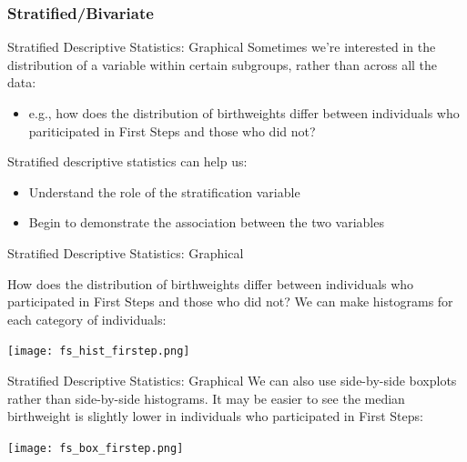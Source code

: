 \documentclass[10pt,t]{beamer}
\begin{document}
\subsubsection{Stratified/Bivariate}

\begin{frame}{Stratified Descriptive Statistics: Graphical}
Sometimes we're interested in the distribution of a variable within certain subgroups, rather than across all the data:

\vspace{0.3cm}

\begin{itemize}
	\item e.g., how does the distribution of birthweights differ between individuals who pariticipated in First Steps and those who did not?
\end{itemize}

\vspace{0.3cm}

Stratified descriptive statistics can help us:

\vspace{0.3cm}

\begin{itemize}
	\item Understand the role of the stratification variable
	\medskip
	\item Begin to demonstrate the association between the two variables
\end{itemize}

\end{frame}

\begin{frame}{Stratified Descriptive Statistics: Graphical}

How does the distribution of birthweights differ between individuals who participated in First Steps and those who did not? We can make histograms for each category of individuals:

\vspace{0.3cm}

\centering \texttt{[image: fs\_hist\_firstep.png]}

\end{frame}

\begin{frame}{Stratified Descriptive Statistics: Graphical}
We can also use side-by-side boxplots rather than side-by-side histograms. It may be easier to see the median birthweight is slightly lower in individuals who participated in First Steps:

\vspace{0.3cm}

\centering \texttt{[image: fs\_box\_firstep.png]}
\end{frame}
\end{document}
